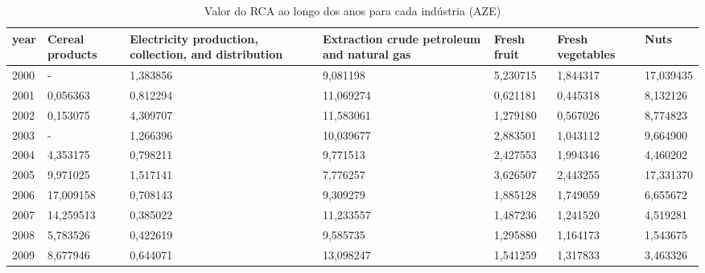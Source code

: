\begin{table}
\centering
\caption{Valor do RCA ao longo dos anos para cada indústria (AZE)}
\begin{tabular}{p{1cm}p{2cm}p{2cm}p{2cm}p{2cm}p{2cm}p{2cm}}
\toprule
 year &  Cereal products &  Electricity production, collection, and distribution &  Extraction crude petroleum and natural gas &  Fresh fruit &  Fresh vegetables &      Nuts \\
\midrule
 2000 &                - &                                           1,383856 &                                    9,081198 &     5,230715 &          1,844317 & 17,039435 \\
 2001 &         0,056363 &                                           0,812294 &                                   11,069274 &     0,621181 &          0,445318 &  8,132126 \\
 2002 &         0,153075 &                                           4,309707 &                                   11,583061 &     1,279180 &          0,567026 &  8,774823 \\
 2003 &                - &                                           1,266396 &                                   10,039677 &     2,883501 &          1,043112 &  9,664900 \\
 2004 &         4,353175 &                                           0,798211 &                                    9,771513 &     2,427553 &          1,994346 &  4,460202 \\
 2005 &         9,971025 &                                           1,517141 &                                    7,776257 &     3,626507 &          2,443255 & 17,331370 \\
 2006 &        17,009158 &                                           0,708143 &                                    9,309279 &     1,885128 &          1,749059 &  6,655672 \\
 2007 &        14,259513 &                                           0,385022 &                                   11,233557 &     1,487236 &          1,241520 &  4,519281 \\
 2008 &         5,783526 &                                           0,422619 &                                    9,585735 &     1,295880 &          1,164173 &  1,543675 \\
 2009 &         8,677946 &                                           0,644071 &                                   13,098247 &     1,541259 &          1,317833 &  3,463326 \\

\end{tabular}
\end{table}
